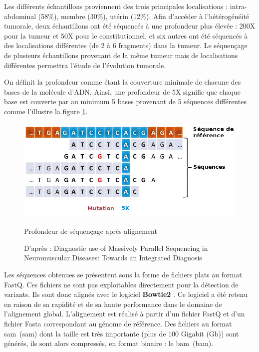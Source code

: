 Les différents échantillons proviennent des trois principales localisations : intra-abdominal (58\%), membre (30\%), utérin (12\%). Afin d'accéder à l'hétérogénéité tumorale, deux échantillons ont été séquencés à une profondeur plus élevée : 200X pour la tumeur et 50X pour le constitutionnel, et six autres ont été séquencés à des localisations différentes (de 2 à 6 fragments) dans la tumeur. Le séquençage de plusieurs échantillons provenant de la même tumeur mais de localisations différentes permettra l'étude de l'évolution tumorale.

On définit la profondeur comme étant la couverture minimale de chacune des bases de la molécule d'ADN. Ainsi, une profondeur de 5X signifie que chaque base est couverte par au minimum 5 bases provenant de 5 séquences différentes comme l'illustre la figure \ref{depth}.

\begin{figure}[h]
\centering
\includegraphics[scale=0.6]{Figures/depth.png}
\caption{Profondeur de séquençage après alignement}
\caption*{D'après : Diagnostic use of Massively Parallel Sequencing in Neuromuscular Diseases: Towards an Integrated Diagnosis}
\label{depth}
\end{figure}

Les séquences obtenues se présentent sous la forme de fichiers plats au format FastQ. Ces fichiers ne sont pas exploitables directement pour la détection de variants. Ils sont donc alignés avec le logiciel \textbf{Bowtie2} \citep{Bowtie}. Ce logiciel a été retenu en raison de sa rapidité et de sa haute performance dans le domaine de l'alignement global. L'alignement est réalisé  à partir d'un fichier FastQ et d'un fichier Fasta correspondant au génome de référence. Des fichiers au format \og \acrlong{sam}\fg  ~(\acrshort{sam}) dont la taille est très importante (plus de 100 Gigabit (Gb)) sont générés, ils sont alors compressés, en format binaire : le \og \acrlong{bam}\fg ~(\acrshort{bam}).

